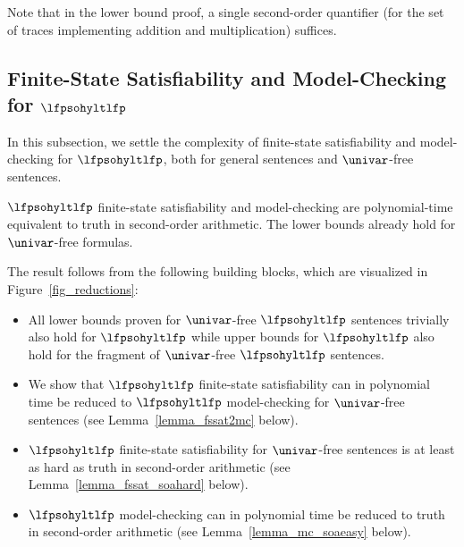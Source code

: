 Note that in the lower bound proof, a single second-order quantifier (for the set of traces implementing addition and multiplication) suffices. 

\subsection{\texorpdfstring{Finite-State Satisfiability and Model-Checking for \boldmath$\lfpsohyltlfp$}{Finite-State Satisfiability and Model-Checking for Second-order HyperLTL with Least Fixed Points}}

In this subsection, we settle the complexity of finite-state satisfiability and model-checking for $\lfpsohyltlfp$, both for general sentences and $\univar$-free sentences.

\begin{thm}
\label{thm_fssatmccomplexity_lfp}
$\lfpsohyltlfp$ finite-state satisfiability and model-checking are poly\-nomial-time equivalent to truth in second-order arithmetic. The lower bounds already hold for $\univar$-free formulas.
\end{thm}

The result follows from the following building blocks, which are visualized in Figure~\ref{fig_reductions}:

\begin{itemize}
    \item All lower bounds proven for $\univar$-free $\lfpsohyltlfp$ sentences trivially also hold for $\lfpsohyltlfp$ while upper bounds for $\lfpsohyltlfp$ also hold for the fragment of $\univar$-free $\lfpsohyltlfp$ sentences.
    \item We show that $\lfpsohyltlfp$ finite-state satisfiability can in polynomial time be reduced to $\lfpsohyltlfp$ model-checking for $\univar$-free sentences (see Lemma~\ref{lemma_fssat2mc} below).
    \item $\lfpsohyltlfp$ finite-state satisfiability for $\univar$-free sentences is at least as hard as truth in second-order arithmetic (see Lemma~\ref{lemma_fssat_soahard} below).
    \item $\lfpsohyltlfp$ model-checking can in polynomial time be reduced to truth in second-order arithmetic (see Lemma~\ref{lemma_mc_soaeasy} below).
\end{itemize}


